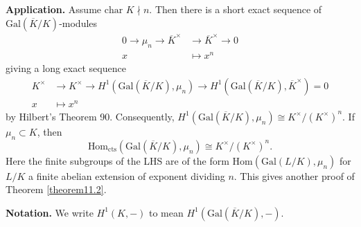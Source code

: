 \documentclass{article}
\theoremstyle{definition}
\begin{document}
\textbf{Application.} Assume $\text{char }K \nmid n$. Then there is a short exact sequence of $\text{Gal}(\overline{K}/K)$-modules 
\begin{align*}
    0 \to \mu_n \to \overline{K}^\times &\to \overline{K}^\times \to 0 \\
    x &\mapsto x^n
\end{align*} 
giving a long exact sequence
\begin{align*}
    K^\times &\to K^\times \to H^1(\text{Gal}(\overline{K}/K),\mu_n) \to H^1(\text{Gal}(\overline{K}/K),\overline{K}^\times) = 0\\
    x &\mapsto x^n
\end{align*}
by Hilbert's Theorem 90. Consequently, $H^1(\text{Gal}(\overline{K}/K),\mu_n) \cong K^\times/(K^\times)^n$. If $\mu_n \subset K$, then \[
\text{Hom}_{\text{cts}}(\text{Gal}(\overline{K}/K),\mu_n) \cong K^\times/(K^\times)^n.
\]
Here the finite subgroups of the LHS are of the form $\text{Hom}(\text{Gal}(L/K),\mu_n)$ for $L/K$ a finite abelian extension of exponent dividing $n$. This gives another proof of Theorem \ref{theorem11.2}.

\textbf{Notation.} We write $H^1(K,-)$ to mean $H^1(\text{Gal}(\overline{K}/K),-)$. 
\vspace{1mm}
 
\end{document}
